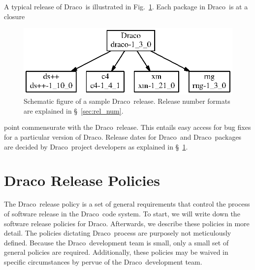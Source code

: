 \documentclass[11pt]{nmemo}
\newcommand{\draco}{{\normalfont\normalsize\textsf Draco}}
\begin{document}
A typical release of \draco\ is illustrated in
Fig.~\ref{fig:drelease}.  Each package in \draco\ is at a closure
\begin{figure}
  \centerline{\includegraphics{drelease.eps}}
  \caption{Schematic figure of a sample \draco\ release.  Release
    number formats are explained in \S~\ref{sec:rel_num}.}
  \label{fig:drelease}
\end{figure}
point commensurate with the \draco\ release.  This entails easy access
for bug fixes for a particular version of \draco.  Release dates for
\draco\ and \draco\ packages are decided by \draco\ project
developers as explained in \S~\ref{sec:policy}.

 
\section{Draco Release Policies}
\label{sec:policy}

The \draco\ release policy is a set of general requirements that
control the process of software release in the \draco\ code system.
To start, we will write down the software release policies for \draco.
Afterwards, we describe these policies in more detail.  The policies
dictating \draco\ process are purposely not meticulously defined.
Because the \draco\ development team is small, only a small set of
general policies are required.  Additionally, these policies may be
waived in specific circumstances by pervue of the \draco\ development
team.
\end{document}

